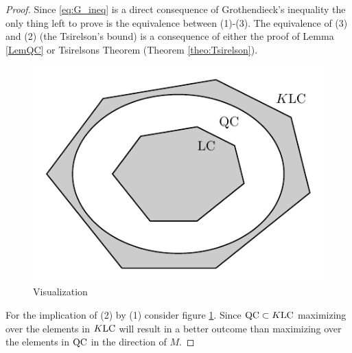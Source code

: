 	\begin{proof}
		Since \eqref{eq:G_ineq} is a direct consequence of Grothendieck's inequality the only thing left to prove is the equivalence between (1)-(3). The equivalence of (3) and (2) (the Tsirelson's bound) is a consequence of either the proof of Lemma \ref{LemQC} or Tsirelsons Theorem (Theorem \ref{theo:Tsirelson}).
		
		\begin{figure}
			\includegraphics[scale=1]{chapters/fig_QC&LC.pdf}
			\caption{Visualization } \label{fig:QCLC}
		\end{figure}
		
		For the implication of (2) by (1) consider figure \ref{fig:QCLC}. Since $\textup{QC}\subset K\textup{LC}$ maximizing over the elements in $K\textup{LC}$ will result in a better outcome than maximizing over the elements in $\textup{QC}$ in the direction of $M$.
	\end{proof}
\newpage